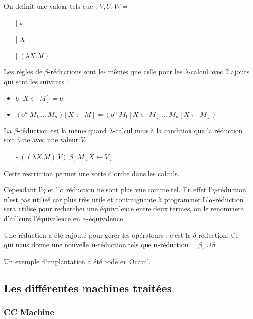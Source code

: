 \documentclass[10pt,a4paper]{article}
\begin{document}
			On definit une valeur tels que :
			\smallbreak
			$V,U,W =$
			\begin{itemize}
				\item[|] $b$
				\item[|] $X$
				\item[|] $(\lambda X.M)$
			\end{itemize}
			\bigbreak
			
			
			Les règles de $\beta$-réductions sont les mêmes que celle pour les $\lambda$-calcul avec 2 ajouts qui sont les suivants :
			\begin{itemize}
				\item $b[X \longleftarrow M] = b$
				\item $(o^{n}~M_{1}~...~M_{n})[X \longleftarrow M] = (o^{n}~M_{1}[X \longleftarrow M]~...~M_{n}[X \longleftarrow M])$
			\end{itemize}
			\bigbreak
			
			
			La $\beta$-réduction est la même quand $\lambda$-calcul mais à la condition que la réduction soit faite avec une valeur $V$. 
			\begin{itemize}
				\item[-] $((\lambda X.M)~V)~\beta_{v}~M[X \longleftarrow V]$
			\end{itemize} 
			\smallbreak
			Cette restriction permet une sorte d'ordre dans les calculs.
			\medbreak
			
			Cependant l'$\eta$ et l'$\alpha$ réduction ne sont plus vue comme tel. En effet l'$\eta$-réduction n'est pas utilisé car plus très utile et contraignante à programmer.L'$\alpha$-réduction sera utilisé pour rechercher une équivalence entre deux termes, on le renommera d'ailleurs l'équivalence en $\alpha$-équivalence.
			\medbreak
			
			Une réduction a été rajouté pour gérer les opérateurs : c'est la $\delta$-réduction. Ce qui nous donne une nouvelle \textbf{n}-réduction tels que \textbf{n}-réduction = $\beta_{v} \cup \delta$
			\bigbreak
			
			Un exemple d'implantation a été codé en Ocaml.
			
		\subsection{Les différentes machines traitées}\label{Machine}
			
			\subsubsection{CC Machine}
			
\end{document}
